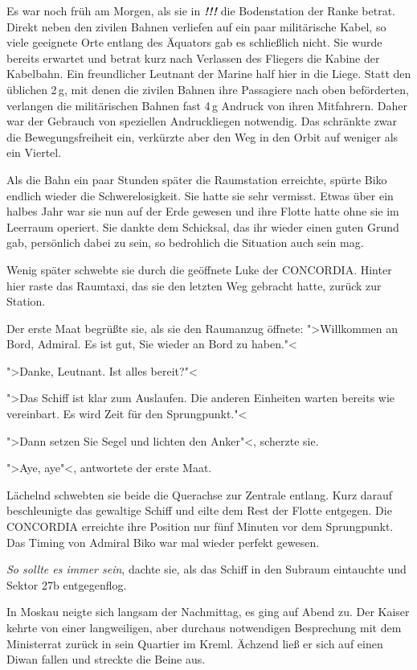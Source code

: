 \documentclass[11pt,twoside,openany]{scrbook}
\begin{document}
Es war noch früh am Morgen, als sie in \emph{\textbf{!!!}} die Bodenstation der Ranke betrat. Direkt neben den zivilen Bahnen verliefen auf ein paar militärische Kabel, so viele geeignete Orte entlang des Äquators gab es schließlich nicht. Sie wurde bereits erwartet und betrat kurz nach Verlassen des Fliegers die Kabine der Kabelbahn. Ein freundlicher Leutnant der Marine half hier in die Liege. Statt den üblichen 2\,g, mit denen die zivilen Bahnen ihre Passagiere nach oben beförderten, verlangen die militärischen Bahnen fast 4\,g Andruck von ihren Mitfahrern. Daher war der Gebrauch von speziellen Andruckliegen notwendig. Das schränkte zwar die Bewegungsfreiheit ein, verkürzte aber den Weg in den Orbit auf weniger als ein Viertel.

Als die Bahn ein paar Stunden später die Raumstation erreichte, spürte Biko endlich wieder die Schwerelosigkeit. Sie hatte sie sehr vermisst. Etwas über ein halbes Jahr war sie nun auf der Erde gewesen und ihre Flotte hatte ohne sie im Leerraum operiert. Sie dankte dem Schicksal, das ihr wieder einen guten Grund gab, persönlich dabei zu sein, so bedrohlich die Situation auch sein mag.

Wenig später schwebte sie durch die geöffnete Luke der \textsf{CONCORDIA}. Hinter hier raste das Raumtaxi, das sie den letzten Weg gebracht hatte, zurück zur Station.

Der erste Maat begrüßte sie, als sie den Raumanzug öffnete: ">Willkommen an Bord, Admiral. Es ist gut, Sie wieder an Bord zu haben."<

">Danke, Leutnant. Ist alles bereit?"<

">Das Schiff ist klar zum Auslaufen. Die anderen Einheiten warten bereits wie vereinbart. Es wird Zeit für den Sprungpunkt."<

">Dann setzen Sie Segel und lichten den Anker"<, scherzte sie.

">Aye, aye"<, antwortete der erste Maat.

Lächelnd schwebten sie beide die Querachse zur Zentrale entlang. Kurz darauf beschleunigte das gewaltige Schiff und eilte dem Rest der Flotte entgegen. Die \textsf{CONCORDIA} erreichte ihre Position nur fünf Minuten vor dem Sprungpunkt. Das Timing von Admiral Biko war mal wieder perfekt gewesen.

\emph{So sollte es immer sein}, dachte sie, als das Schiff in den Subraum eintauchte und Sektor \textsf{27b} entgegenflog. 

\mbox{}

In Moskau neigte sich langsam der Nachmittag, es ging auf Abend zu. Der Kaiser kehrte von einer langweiligen, aber durchaus notwendigen Besprechung mit dem Ministerrat zurück in sein Quartier im Kreml. Ächzend ließ er sich auf einen Diwan fallen und streckte die Beine aus.
\end{document}
